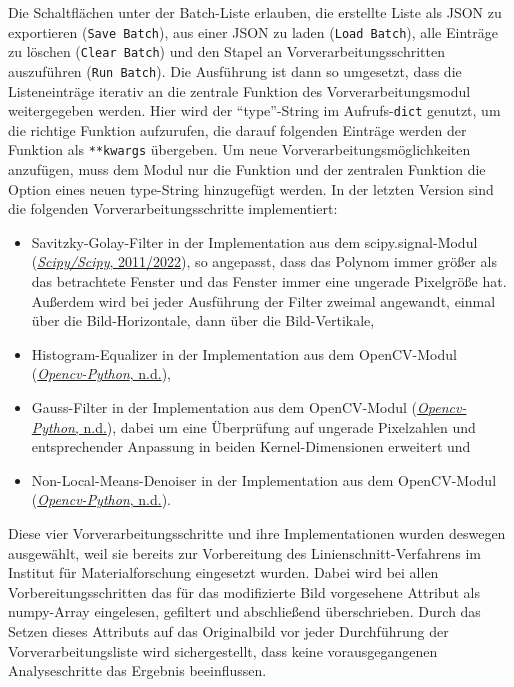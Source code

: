 \documentclass[
  12pt,
  openany]{book}
\begin{document}
Die Schaltflächen unter der Batch-Liste erlauben, die erstellte Liste als JSON zu exportieren (\texttt{Save\ Batch}), aus einer JSON zu laden (\texttt{Load\ Batch}), alle Einträge zu löschen (\texttt{Clear\ Batch}) und den Stapel an Vorverarbeitungsschritten auszuführen (\texttt{Run\ Batch}).
Die Ausführung ist dann so umgesetzt, dass die Listeneinträge iterativ an die zentrale Funktion des Vorverarbeitungsmodul weitergegeben werden. Hier wird der ``type''-String im Aufrufs-\texttt{dict} genutzt, um die richtige Funktion aufzurufen, die darauf folgenden Einträge werden der Funktion als \texttt{**kwargs} übergeben. Um neue Vorverarbeitungsmöglichkeiten anzufügen, muss dem Modul nur die Funktion und der zentralen Funktion die Option eines neuen type-String hinzugefügt werden.
In der letzten Version sind die folgenden Vorverarbeitungsschritte implementiert:

\begin{itemize}
\item
  Savitzky-Golay-Filter in der Implementation aus dem scipy.signal-Modul (\protect\hyperlink{ref-ScipyScipy2022}{\emph{Scipy/Scipy}, 2011/2022}), so angepasst, dass das Polynom immer größer als das betrachtete Fenster und das Fenster immer eine ungerade Pixelgröße hat. Außerdem wird bei jeder Ausführung der Filter zweimal angewandt, einmal über die Bild-Horizontale, dann über die Bild-Vertikale,
\item
  Histogram-Equalizer in der Implementation aus dem OpenCV-Modul (\protect\hyperlink{ref-OpencvpythonWrapperPackage}{\emph{Opencv-Python}, n.d.}),
\item
  Gauss-Filter in der Implementation aus dem OpenCV-Modul (\protect\hyperlink{ref-OpencvpythonWrapperPackage}{\emph{Opencv-Python}, n.d.}), dabei um eine Überprüfung auf ungerade Pixelzahlen und entsprechender Anpassung in beiden Kernel-Dimensionen erweitert und
\item
  Non-Local-Means-Denoiser in der Implementation aus dem OpenCV-Modul (\protect\hyperlink{ref-OpencvpythonWrapperPackage}{\emph{Opencv-Python}, n.d.}).
\end{itemize}

Diese vier Vorverarbeitungsschritte und ihre Implementationen wurden deswegen ausgewählt, weil sie bereits zur Vorbereitung des Linienschnitt-Verfahrens im Institut für Materialforschung eingesetzt wurden. Dabei wird bei allen Vorbereitungsschritten das für das modifizierte Bild vorgesehene Attribut als numpy-Array eingelesen, gefiltert und abschließend überschrieben. Durch das Setzen dieses Attributs auf das Originalbild vor jeder Durchführung der Vorverarbeitungsliste wird sichergestellt, dass keine vorausgegangenen Analyseschritte das Ergebnis beeinflussen.
\end{document}
